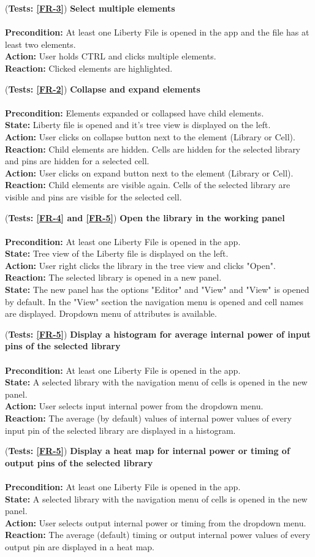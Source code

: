 \documentclass[10pt,a4paper]{report}
\newcommand{\precondition}[1]{
    \textbf{Precondition: } #1 \leavevmode \\
}
\newcommand{\action}[1]{
    \textbf{Action: } #1 \leavevmode \\
}
\newcommand{\state}[1]{
    \textbf{State: } #1 \leavevmode \\
}
\newcommand{\reaction}[1]{
    \textbf{Reaction: } #1 \leavevmode \\
}
\newcommand{\GTCDescription}[2]{
    (\textbf{Tests: #1}) \textbf{#2} \leavevmode \\
}
\begin{document}
\begin{GTC}
    \item \GTCDescription{\ref{FR-3}}{Select multiple elements} \leavevmode \\ \precondition{At least one Liberty File is opened in the app and the file has at least two elements.}\action{User holds CTRL and clicks multiple elements.}\reaction{Clicked elements are highlighted.
}
    \item \GTCDescription{\ref{FR-2}}{Collapse and expand elements} \leavevmode \\ \precondition{Elements expanded or collapsed have child elements.}\state{Liberty file is opened and it's tree view is displayed on the left.}\action{User clicks on collapse button next to the element (Library or Cell).}\reaction{Child elements are hidden. Cells are hidden for the selected library and pins are hidden for a selected cell.}\action{User clicks on expand button next to the element (Library or Cell).}\reaction{Child elements are visible again. Cells of the selected library are visible and pins are visible for the selected cell. 
}
    \item \GTCDescription{\ref{FR-4} and \ref{FR-5}}{Open the library in the working panel} \leavevmode \\ \precondition{At least one Liberty File is opened in the app.}\state{Tree view of the Liberty file is displayed on the left.}\action{User right clicks the library in the tree view and clicks "Open".}\reaction{The selected library is opened in a new panel.}\state{The new panel has the options "Editor" and "View" and "View" is opened by default. In the "View" section the navigation menu is opened and cell names are displayed. Dropdown menu of attributes is available. 
}
    \item \GTCDescription{\ref{FR-5}}{ Display a histogram for average internal power of input pins of the selected library} \leavevmode \\ \precondition{At least one Liberty File is opened in the app. }\state{A selected library with the navigation menu of cells is opened in the new panel.}\action{User selects input internal power from the dropdown menu. }\reaction{The average (by default) values of internal power values of every input pin of the selected library are displayed in a histogram.
}
    \item \GTCDescription{\ref{FR-5}}{Display a heat map for internal power or timing of output pins of the selected library} \leavevmode \\ \precondition{At least one Liberty File is opened in the app.}\state{A selected library with the navigation menu of cells is opened in the new panel.}\action{User selects output internal power or timing from the dropdown menu.}\reaction{The average (default) timing or output internal power values of every output pin are displayed in a heat map.
}
\end{GTC}
\end{document}
